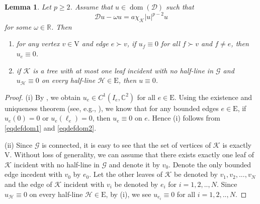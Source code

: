 \documentclass[11pt]{amsart}
\newtheorem{lemma}[theorem]{Lemma}
\newcommand{\abs}[1]{\lvert#1\rvert}
\newcommand{\D}{\mathcal{D}}
\newcommand{\G}{\mathcal{G}}
\newcommand{\K}{\mathcal{K}}
\numberwithin{equation}{section}
\begin{document}
\begin{lemma}\label{lemtree}
    Let $p \geq 2$. Assume that $u \in \operatorname{dom}(\D)$ such that
\[
\D u-\omega u =a\chi_{\K}\abs{u}^{p-2} u
\]
for some $\omega \in \mathbb{R}$. Then
    \begin{enumerate}[label=\rm(\roman*)]
        \item
for any vertex $v \in \mathrm{V}$ and edge $e\succ v$, if $u_f\equiv 0$ for all $f\succ v$ and $f\neq e$, then $u_e\equiv 0$.
\item if $\K$ is a tree with at most one leaf incident with no half-line in $\G$ and $u_{\mathcal{H}} \equiv 0$ on every half-line $\mathcal{H}\in\mathrm{E}$, then $u \equiv 0$.
\end{enumerate}
\end{lemma}
\begin{proof}(i)
By \cite[Remark 6 in Chapter 8]{Ha}, we obtain $u_e\in C^1(I_e,\mathbb{C}^2)$ for all $e \in \mathrm{E}$. Using the existence and uniqueness theorem (see, e.g., \cite[Section 2.2]{Pe}), we know that for any bounded edges $e \in \mathrm{E}$, if  $u_e(0)=0$ or $u_e(\ell_e)=0$, then $u_e\equiv 0$ on $e$. Hence (i) follows from \eqref{eqdefdom1} and \eqref{eqdefdom2}.

(ii) Since $\G$ is connected, it is easy to see that the set of vertices of $\K$ is exactly $\mathrm{V}$. Without loss of generality, we can assume that there exists exactly one leaf of $\K$ incident with no half-line in $\G$ and denote it by $v_0$. Denote the only bounded edge incedent with $v_0$ by $e_0$.
Let the other leaves of $\K$ be denoted by $v_1,v_2,...,v_N$ and the edge of $\K$ incident with $v_i$ be denoted by $e_i$ for $i=1,2,..,N$. Since $u_{\mathcal{H}} \equiv 0$ on every half-line $\mathcal{H}\in\mathrm{E}$, by (i),
we see $u_{e_i}\equiv 0$  for all $i=1,2,..,N$.



\end{proof}
\end{document}

